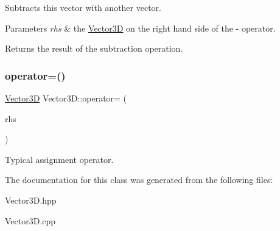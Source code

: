 Subtracts this vector with another vector.


\begin{DoxyParams}{Parameters}
{\em rhs} & the \hyperlink{classVector3D}{Vector3D} on the right hand side of the -\/ operator. \\
\hline
\end{DoxyParams}
\begin{DoxyReturn}{Returns}
the result of the subtraction operation. 
\end{DoxyReturn}
\mbox{\label{classVector3D_ae19e70a6888b99ec7fb3e48c04cf6386}} 
\subsubsection{\texorpdfstring{operator=()}{operator=()}}
{\footnotesize\ttfamily \hyperlink{classVector3D}{Vector3D} Vector3\+D\+::operator= (\begin{DoxyParamCaption}\item[{const \hyperlink{classVector3D}{Vector3D} \&}]{rhs }\end{DoxyParamCaption})}

Typical assignment operator. 

The documentation for this class was generated from the following files\+:\begin{DoxyCompactItemize}
\item 
Vector3\+D.\+hpp\item 
Vector3\+D.\+cpp\end{DoxyCompactItemize}
